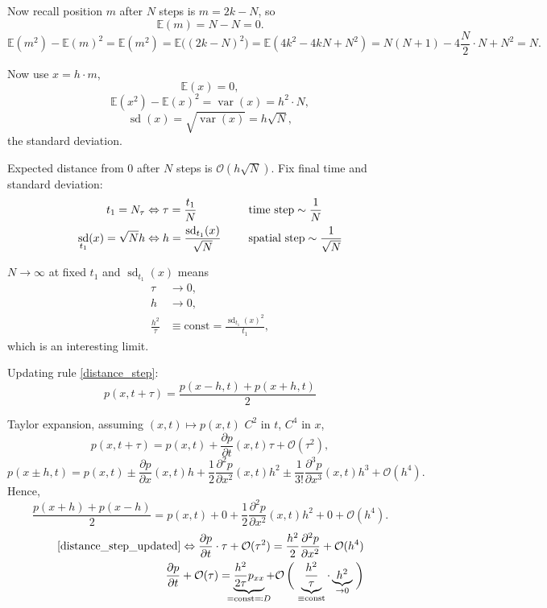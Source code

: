 \documentclass[12pt]{article}
\DeclareMathOperator{\var}{var}
\DeclareMathOperator{\sd}{sd}
\theoremstyle{definition}
\begin{document}
Now recall position $m$ after $N$ steps is $m=2k-N$, so
\[\mathbb E(m)=N-N=0.\]
\[\mathbb E(m^2)-\mathbb E(m)^2=\mathbb E(m^2)=\mathbb E\big((2k-N)^2\big)=\mathbb E(4k^2-4kN+N^2)=N(N+1)-4\frac N2\cdot N+N^2=N.\]

Now use $x=h\cdot m$,
\[\mathbb E(x)=0,\]
\[\mathbb E(x^2)-\mathbb E(x)^2=\var(x)=h^2\cdot N,\]
\[\sd(x)=\sqrt{\var(x)}=h\sqrt N,\]
the standard deviation.

Expected distance from $0$ after $N$ steps is $\mathcal O(h\sqrt N)$. Fix final time and standard deviation:
\begin{alignat*}{2}
t_1=N_\tau&\Leftrightarrow\tau=\frac{t_1}N&&\text{time step}\sim\frac1N\\
\sd_{t_1}(x)=\sqrt Nh&\Leftrightarrow h=\frac{\sd_{t_1}(x)}{\sqrt N}\hspace{5mm}&&\text{spatial step}\sim\frac1{\sqrt N}
\end{alignat*}

$N\to\infty$ at fixed $t_1$ and $\sd_{t_1}(x)$ means
\begin{equation}\tag{$*$}\label{limit_RW}
\begin{split}
\tau&\to0,\\
h&\to0,\\
\frac{h^2}\tau&\equiv\text{const}=\frac{\sd_{t_1}(x)^2}{t_1},
\end{split}
\end{equation}
which is an interesting limit.

Updating rule \ref{distance_step}:
\begin{equation}\tag{U}\label{distance_step_updated}
p(x,t+\tau)=\frac{p(x-h,t)+p(x+h,t)}2
\end{equation}

Taylor expansion, assuming $(x,t)\mapsto p(x,t)$ $C^2$ in $t$, $C^4$ in $x$,
\[p(x,t+\tau)=p(x,t)+\frac{\partial p}{\partial t}(x,t)\tau+\mathcal O(\tau^2),\]
\[p(x\pm h,t)=p(x,t)\pm\frac{\partial p}{\partial x}(x,t)h+\frac12\frac{\partial^2p}{\partial x^2}(x,t)h^2\pm\frac1{3!}\frac{\partial^3p}{\partial x^3}(x,t)h^3+\mathcal O(h^4).\]
Hence,
\[\frac{p(x+h)+p(x-h)}2=p(x,t)+0+\frac12\frac{\partial^2p}{\partial x^2}(x,t)h^2+0+\mathcal O(h^4).\]
\begin{align*}
\text{\eqref{distance_step_updated}}\Leftrightarrow\frac{\partial p}{\partial t}\cdot\tau+\mathcal O(\tau^2)=\frac{h^2}2\frac{\partial^2p}{\partial x^2}+\mathcal O(h^4)\\
\frac{\partial p}{\partial t}+\mathcal O(\tau)=\underbrace{\frac{h^2}{2\tau}p_{xx}}_{\mathclap{=\text{const}\eqqcolon D}}+\mathcal O\left(\vphantom{\frac{h^2}\tau}\right.\underbrace{\frac{h^2}\tau}_{\equiv\text{const}}\cdot\underbrace{h^2}_{\rightarrow0}\left.\vphantom{\frac{h^2}\tau}\right)
\end{align*}
\end{document}
